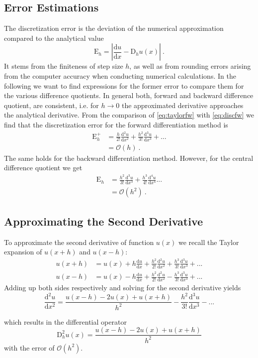 \subsection{Error Estimations}
The discretization error is the deviation of the numerical approximation compared to the analytical value
\begin{equation}
  \mathrm{E}_h = |\frac{\mathrm{d} u}{\mathrm{d} x} - \mathrm{D}_h u(x)|~.
\end{equation}
It stems from the finiteness of step size $h$, as well as from rounding errors arising from the computer accuracy when conducting numerical calculations. In the following we want to find expressions for the former error to compare them for the various difference quotients.
In general both, forward and backward difference quotient, are consistent, i.e. for $h \rightarrow 0$ the approximated derivative approaches the analytical derivative. From the comparison of \ref{eq:taylorfw} with \ref{eq:discfw} we find that the discretization error for the forward differentiation method is
\begin{align}
  \mathrm{E}^+_h &= \frac{h}{2!} \frac{\mathrm{d}^2 u}{\mathrm{d} x^2} + \frac{h^2}{3!} \frac{\mathrm{d}^3 u}{\mathrm{d} x^3} + ... \\
  &= \mathcal{O}(h)~.
\end{align}
The same holds for the backward differentiation method.
However, for the central difference quotient we get
\begin{align}
\mathrm{E}_h &= \frac{h^2}{3!} \frac{\mathrm{d}^3 u}{\mathrm{d} x^3} + \frac{h^3}{4!} \frac{\mathrm{d}^4 u}{\mathrm{d} x^4}... \\
&= \mathcal{O}(h^2)~.
\end{align}
\subsection{Approximating the Second Derivative}
To approximate the second derivative of function $u(x)$ we recall the Taylor expansion of $u(x+h)$ and $u(x-h)$:
\begin{align}
  u(x+h) &= u(x) + h \frac{\mathrm{d} u}{\mathrm{d} x} + \frac{h^2}{2!} \frac{\mathrm{d}^2 u}{\mathrm{d} x^2} + \frac{h^3}{3!} \frac{\mathrm{d}^3 u}{\mathrm{d} x^3} + ... \\
  u(x-h) &= u(x) - h \frac{\mathrm{d} u}{\mathrm{d} x} + \frac{h^2}{2!} \frac{\mathrm{d}^2 u}{\mathrm{d} x^2} - \frac{h^3}{3!} \frac{\mathrm{d}^3 u}{\mathrm{d} x^3} + ...
\end{align}
Adding up both sides respectively and solving for the second derivative yields
\begin{equation}
  \frac{\mathrm{d}^2 u}{\mathrm{d} x^2} = \frac{u(x-h) - 2 u(x) + u(x+h)}{h^2} - \frac{h^2}{3!} \frac{\mathrm{d}^3 u}{\mathrm{d} x^3} - ...
\end{equation}

which results in the differential operator
\begin{equation}
  \mathrm{D}^2_h u(x) = \frac{u(x-h) - 2 u(x) + u(x+h)}{h^2}
\end{equation}
with the error of $\mathcal{O}(h^2)$.